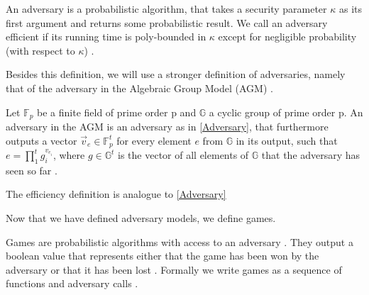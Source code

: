 \begin{definition}
    \label{Adversary}
An adversary is a probabilistic algorithm, that takes a security parameter $\kappa$ as its first argument and returns some probabilistic result. 
We call an adversary efficient if its running time is poly-bounded in $\kappa$ except for negligible probability (with respect to $\kappa$)
\parencite{boneh_shoup}.
\end{definition}

Besides this definition, we will use a stronger definition of adversaries, namely that of the adversary in the Algebraic Group Model (AGM) \parencite{AGM}.

\begin{definition}
    Let $\mathbb{F}_p$ be a finite field of prime order p and $\mathbb{G}$ a cyclic group of prime order p. An adversary in the AGM is an adversary as in \ref{Adversary}, that furthermore outputs a vector $\vec{v}_e \in \mathbb{F}_p^t$ for every element $e$ from $\mathbb{G}$ in its output, such that $e = \prod_{1}^{t} g_i^{v_{e_i}}$, where $g\in \mathbb{G}^t$ is the vector of all elements of $\mathbb{G}$ that the adversary has seen so far
    \parencite{AGM}. 

    The efficiency definition is analogue to \ref*{Adversary}
\end{definition}

Now that we have defined adversary models, we define games. 

\begin{definition}[games]
Games are probabilistic algorithms with access to an adversary \parencite*{boneh_shoup}. They output a boolean value that represents either that the game has been won by the adversary or that it has been lost \parencite{boneh_shoup}. Formally we write games as a sequence of functions and adversary calls \parencite{boneh_shoup}.
\end{definition}

